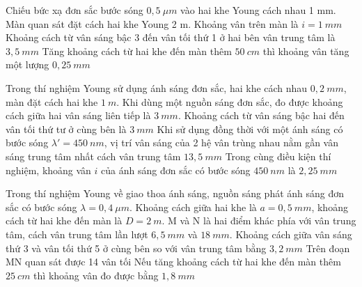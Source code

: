 \begin{ex}
Chiếu bức xạ đơn sắc bước sóng $0,5~ \mu m$ vào hai khe Young cách nhau 1 mm. Màn quan sát đặt cách hai khe Young 2 m.
{\True Khoảng vân trên màn là $i = 1\ mm$}
{\True Khoảng cách từ vân sáng bậc 3 đến vân tối thứ 1 ở hai bên vân trung tâm là $3,5 \  mm$}
{\True Tăng khoảng cách từ hai khe đến màn thêm $50\ cm$ thì khoảng vân tăng một lượng $0,25 \  mm$}
\end{ex}
\begin{ex}
Trong thí nghiệm Young sử dụng ánh sáng đơn sắc, hai khe cách nhau $0,2\ mm$, màn đặt cách hai khe $1\ m$. Khi dùng một nguồn sáng đơn sắc, đo được khoảng cách giữa hai vân sáng liên tiếp là $3\ mm$.
{Khoảng cách từ vân sáng bậc hai đến vân tối thứ tư ở cùng bên là $3\ mm$}
{Khi sử dụng đồng thời với một ánh sáng có bước sóng $\lambda' = 450\ nm$, vị trí vân sáng của 2 hệ vân trùng nhau nằm gần vân sáng trung tâm nhất cách vân trung tâm $13,5\ mm$}
{\True Trong cùng điều kiện thí nghiệm, khoảng vân $i$ của ánh sáng đơn sắc có bước sóng $450\ nm$ là $2,25\ mm$}
\end{ex}
\begin{ex}
Trong thí nghiệm Young về giao thoa ánh sáng, nguồn sáng phát ánh sáng đơn sắc có bước sóng $\lambda=0,4\ \mu m$. Khoảng cách giữa hai khe là $a=0,5\ mm$, khoảng cách từ hai khe đến màn là $D=2\ m$. M và N là hai điểm khác phía với vân trung tâm, cách vân trung tâm lần lượt $6,5\ mm$ và $18\ mm$.
{Khoảng cách giữa vân sáng thứ 3 và vân tối thứ 5 ở cùng bên so với vân trung tâm bằng $3,2\ mm$}
{\True Trên đoạn MN quan sát được 14 vân tối}
{\True Nếu tăng khoảng cách từ hai khe đến màn thêm $25\ cm$ thì khoảng vân đo được bằng $1,8\ mm$}
\loigiai{
\begin{itemchoice}
\itemch 
\itemch 
\itemch 
\itemch 
\end{itemchoice}
}
\end{ex}


